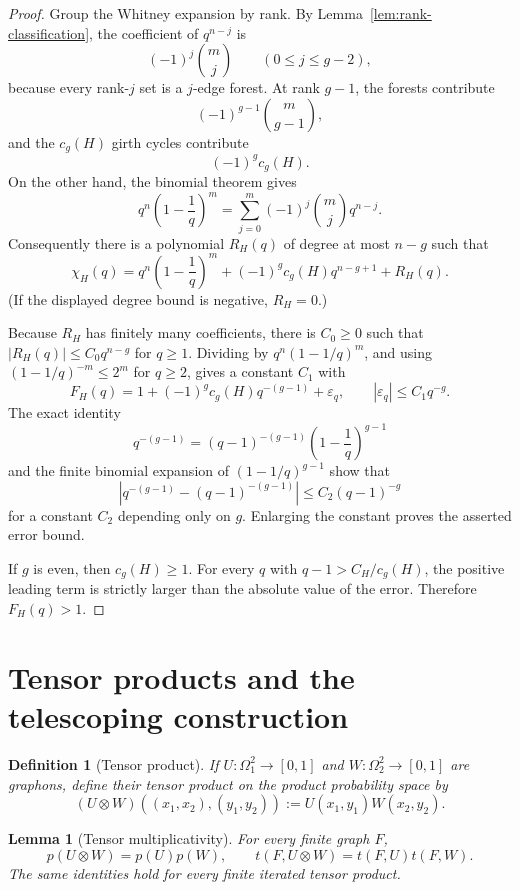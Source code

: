 \documentclass[11pt]{article}
\newtheorem{lemma}{Lemma}
\newtheorem{definition}{Definition}
\begin{document}
\begin{proof}
Group the Whitney expansion by rank.  By
Lemma~\ref{lem:rank-classification}, the coefficient of \(q^{n-j}\) is
\[
    (-1)^j\binom{m}{j}
    \qquad(0\le j\le g-2),
\]
because every rank-\(j\) set is a \(j\)-edge forest.  At rank \(g-1\),
the forests contribute
\[
    (-1)^{g-1}\binom{m}{g-1},
\]
and the \(c_g(H)\) girth cycles contribute
\[
    (-1)^g c_g(H).
\]
On the other hand, the binomial theorem gives
\[
    q^n\left(1-\frac1q\right)^m
    =
    \sum_{j=0}^{m}(-1)^j\binom{m}{j}q^{n-j}.
\]
Consequently there is a polynomial \(R_H(q)\) of degree at most \(n-g\)
such that
\[
    \chi_H(q)
    =
    q^n\left(1-\frac1q\right)^m
    +(-1)^g c_g(H)q^{n-g+1}
    +R_H(q).
\]
(If the displayed degree bound is negative, \(R_H=0\).)

Because \(R_H\) has finitely many coefficients, there is \(C_0\ge0\)
such that \(|R_H(q)|\le C_0q^{n-g}\) for \(q\ge1\).  Dividing by
\(q^n(1-1/q)^m\), and using
\((1-1/q)^{-m}\le2^m\) for \(q\ge2\), gives a constant \(C_1\) with
\[
    F_H(q)
    =
    1+(-1)^g c_g(H)q^{-(g-1)}+\varepsilon_q,
    \qquad
    |\varepsilon_q|\le C_1q^{-g}.
\]
The exact identity
\[
    q^{-(g-1)}
    =(q-1)^{-(g-1)}
      \left(1-\frac1q\right)^{g-1}
\]
and the finite binomial expansion of
\((1-1/q)^{g-1}\) show that
\[
    \left|q^{-(g-1)}-(q-1)^{-(g-1)}\right|
    \le C_2(q-1)^{-g}
\]
for a constant \(C_2\) depending only on \(g\).  Enlarging the constant
proves the asserted error bound.

If \(g\) is even, then \(c_g(H)\ge1\).  For every \(q\) with
\(q-1>C_H/c_g(H)\), the positive leading term is strictly larger than
the absolute value of the error.  Therefore \(F_H(q)>1\).
\end{proof}

\section{Tensor products and the telescoping construction}

\begin{definition}[Tensor product]
If \(U\colon\Omega_1^2\to[0,1]\) and
\(W\colon\Omega_2^2\to[0,1]\) are graphons, define their tensor product
on the product probability space by
\[
    (U \otimes W)((x_1,x_2),(y_1,y_2))
    :=U(x_1,y_1)W(x_2,y_2).
\]
\end{definition}

\begin{lemma}[Tensor multiplicativity]\label{lem:tensor}
For every finite graph \(F\),
\[
    p(U \otimes W)=p(U)p(W),
    \qquad
    t(F,U \otimes W)=t(F,U)t(F,W).
\]
The same identities hold for every finite iterated tensor product.
\end{lemma}
\end{document}
